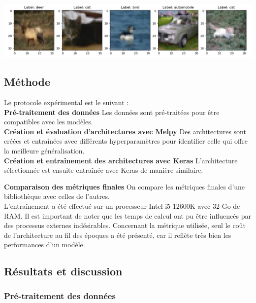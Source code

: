 \begin{multicols}{2}
\includegraphics[width=\columnwidth]{images/cifar10_samples.png}
\hfill\break

\subsection{Méthode}

Le protocole expérimental est le suivant :  \\


\textbf{Pré-traitement des données} Les données sont pré-traitées 
pour être compatibles avec les modèles.\\

\textbf{Création et évaluation d’architectures avec Melpy} Des architectures sont créées 
et entraînées avec différents hyperparamètres pour identifier celle qui offre 
la meilleure généralisation.\\

\textbf{Création et entraînement des architectures avec Keras} L'architecture
sélectionnée est ensuite entraînée avec Keras de manière similaire.


\textbf{Comparaison des métriques finales} On compare les métriques finales d'une bibliothèque
avec celles de l'autres. \\

L’entraînement a été effectué sur un processeur Intel i5-12600K avec 32 Go de RAM. Il est important de 
noter que les temps de calcul ont pu être influencés par des processus externes indésirables. Concernant 
la métrique utilisée, seul le coût de l’architecture au fil des époques a été présenté, car il reflète 
très bien les performances d’un modèle. \\


\subsection{Résultats et discussion}

\subsubsection{Pré-traitement des données}


\end{multicols}
